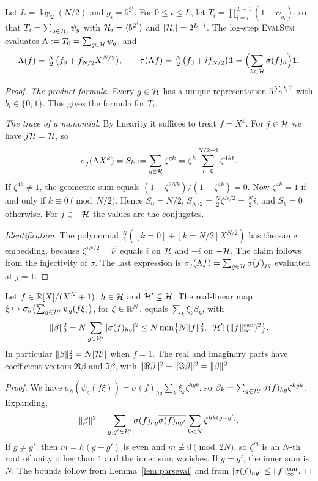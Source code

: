 \begin{lemma}\label{lem:trace}
Let $L=\log_2(N/2)$ and $g_i=5^{2^i}$. For $0\le i\le L$, let $T_i=\prod_{l=i}^{L-1}(1+\psi_{g_l})$, so that $T_i=\sum_{g\in\mathcal{H}_i}\psi_g$ with $\mathcal{H}_i=\langle5^{2^i}\rangle$ and $|\mathcal{H}_i|=2^{L-i}$. The log-step \textsc{EvalSum} evaluates $\mathrm{A}:=T_0=\sum_{g\in\mathcal{H}}\psi_g$, and
\[
  \mathrm{A}(f)=\tfrac N2\bigl(f_0+f_{N/2}X^{N/2}\bigr),\qquad \tau(\mathrm{A} f)=\tfrac N2\bigl(f_0+i f_{N/2}\bigr)\mathbf 1=\Bigl(\sum_{h\in\mathcal{H}}\sigma(f)_h\Bigr)\mathbf 1 .
\]
\end{lemma}
\begin{proof}
\emph{The product formula.} Every $g\in\mathcal{H}$ has a unique representation $5^{\sum_ib_i2^i}$ with $b_i\in\{0,1\}$. This gives the formula for $T_i$.

\emph{The trace of a monomial.} By linearity it suffices to treat $f=X^k$. For $j\in\mathcal{H}$ we have $j\mathcal{H}=\mathcal{H}$, so
\[
  \sigma_j(\mathrm{A} X^k)=S_k:=\sum_{g\in\mathcal{H}}\zeta^{gk}=\zeta^k\sum_{t=0}^{N/2-1}\zeta^{4kt}.
\]
If $\zeta^{4k}\ne1$, the geometric sum equals $(1-\zeta^{2Nk})/(1-\zeta^{4k})=0$. Now $\zeta^{4k}=1$ if and only if $k\equiv0\pmod{N/2}$. Hence $S_0=N/2$, $S_{N/2}=\tfrac N2\zeta^{N/2}=\tfrac N2 i$, and $S_k=0$ otherwise. For $j\in-\mathcal{H}$ the values are the conjugates.

\emph{Identification.} The polynomial $\tfrac N2([k{=}0]+[k{=}N/2]X^{N/2})$ has the same embedding, because $\zeta^{jN/2}=i^j$ equals $i$ on $\mathcal{H}$ and $-i$ on $-\mathcal{H}$. The claim follows from the injectivity of $\sigma$. The last expression is $\sigma_j(\mathrm{A} f)=\sum_{g\in\mathcal{H}}\sigma(f)_{jg}$ evaluated at $j=1$.
\end{proof}

\begin{lemma}\label{lem:slotfun}
Let $f\in\mathbb{R}[X]/(X^N+1)$, $h\in\mathcal{H}$ and $\mathcal{H}'\subseteq\mathcal{H}$. The real-linear map $\xi\mapsto\sigma_h\bigl(\sum_{g\in\mathcal{H}'}\psi_g(f\xi)\bigr)$, for $\xi\in\mathbb{R}^N$, equals $\sum_k\xi_k\beta_k$, with
\[
  \lVert \beta\rVert_2^2=N\sum_{g\in\mathcal{H}'}|\sigma(f)_{hg}|^2\le N\min\bigl\{N\lVert f\rVert_2^2,\ |\mathcal{H}'|\,(\lVert f\rVert^{\mathrm{can}}_{\infty})^2\bigr\}.
\]
In particular $\lVert \beta\rVert_2^2=N|\mathcal{H}'|$ when $f=1$. The real and imaginary parts have coefficient vectors $\Re\beta$ and $\Im\beta$, with $\lVert \Re\beta\rVert^2+\lVert \Im\beta\rVert^2=\lVert \beta\rVert^2$.
\end{lemma}
\begin{proof}
We have $\sigma_h(\psi_g(f\xi))=\sigma(f)_{hg}\sum_k\xi_k\zeta^{hgk}$, so $\beta_k=\sum_{g\in\mathcal{H}'}\sigma(f)_{hg}\zeta^{hgk}$. Expanding,
\[
  \lVert \beta\rVert^2=\sum_{g,g'\in\mathcal{H}'}\sigma(f)_{hg}\overline{\sigma(f)_{hg'}}\sum_{k<N}\zeta^{hk(g-g')}.
\]
If $g\ne g'$, then $m=h(g-g')$ is even and $m\not\equiv0\pmod{2N}$, so $\zeta^m$ is an $N$-th root of unity other than $1$ and the inner sum vanishes. If $g=g'$, the inner sum is $N$. The bounds follow from Lemma~\ref{lem:parseval} and from $|\sigma(f)_{hg}|\le\lVert f\rVert^{\mathrm{can}}_{\infty}$.
\end{proof}

